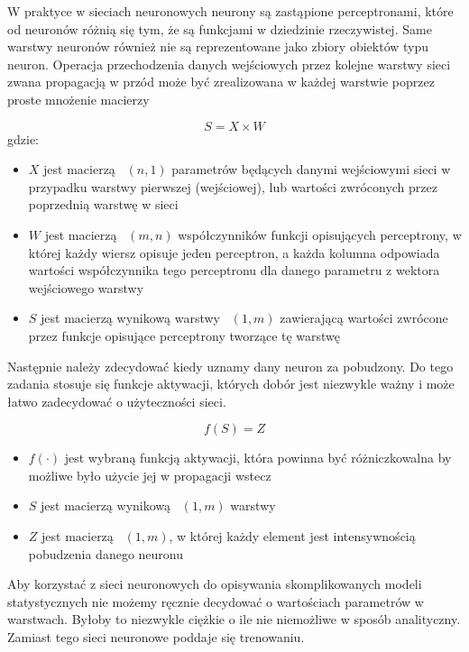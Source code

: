 \documentclass{article}
\begin{document}
W praktyce w sieciach neuronowych neurony są zastąpione perceptronami, które od neuronów 
różnią się tym, że są funkcjami w dziedzinie rzeczywistej.
Same warstwy neuronów również nie są reprezentowane jako zbiory obiektów typu neuron. 
Operacja przechodzenia danych wejściowych przez kolejne warstwy sieci
zwana propagacją w przód może być zrealizowana w każdej warstwie poprzez proste mnożenie macierzy

\begin {equation}
    S = X \times W
\end{equation}
gdzie:
\begin{itemize}
    \item $X$ jest macierzą ~$(n, 1)$ parametrów będących danymi 
    wejściowymi sieci w przypadku warstwy pierwszej (wejściowej), 
    lub wartości zwróconych przez poprzednią warstwę w sieci
    \item $W$ jest macierzą ~$(m, n)$ współczynników funkcji opisujących perceptrony, 
    w której każdy wiersz opisuje jeden perceptron, 
    a każda kolumna odpowiada wartości współczynnika tego perceptronu dla danego parametru 
    z wektora wejściowego warstwy
    \item $S$ jest macierzą wynikową warstwy ~$(1, m)$ zawierającą wartości zwrócone przez 
    funkcje opisujące perceptrony tworzące tę warstwę
\end{itemize}

Następnie należy zdecydować kiedy uznamy dany neuron za pobudzony. Do tego zadania 
stosuje się funkcje aktywacji, których dobór jest niezwykle ważny
i może łatwo zadecydować o użyteczności sieci.

\begin{equation}
    f(S) = Z
\end{equation}

\begin{itemize}
    \item $f(\cdot)$ jest wybraną funkcją aktywacji, która powinna być 
    różniczkowalna by możliwe było użycie jej w propagacji wstecz
    \item $S$ jest macierzą wynikową ~$(1, m)$ warstwy
    \item $Z$ jest macierzą ~$(1, m)$, w której każdy element jest intensywnością pobudzenia danego neuronu
\end{itemize}

Aby korzystać z sieci neuronowych do opisywania skomplikowanych modeli 
statystycznych nie możemy ręcznie decydować o wartościach parametrów w warstwach. 
Byłoby to niezwykle ciężkie o ile nie niemożliwe w sposób analityczny. 
Zamiast tego sieci neuronowe poddaje się trenowaniu.
\end{document}
